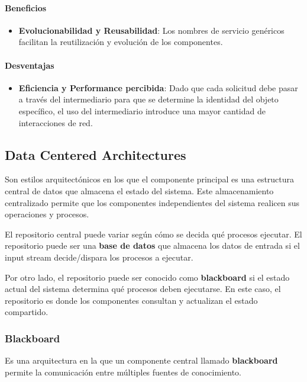 \documentclass{article}
\begin{document}
			\paragraph{Beneficios}
			\begin{itemize}	
				\item {\textbf{Evolucionabilidad y Reusabilidad}}: Los nombres de servicio genéricos facilitan la reutilización y evolución de los componentes.
				
				
			\end{itemize}
			
			\paragraph{Desventajas}
			\begin{itemize}	
				
				\item {\textbf{Eficiencia y Performance percibida}}: Dado que cada solicitud debe pasar a través del intermediario para que se determine la identidad del objeto específico, el uso del intermediario introduce una mayor cantidad de interacciones de red.
				
			\end{itemize}
		
		\subsection{Data Centered Architectures}
		Son estilos arquitectónicos en los que el componente principal es una estructura central de datos que almacena el estado del sistema. Este almacenamiento centralizado permite que los componentes independientes del sistema realicen sus operaciones y procesos.
		
		El repositorio central puede variar según cómo se decida qué procesos ejecutar. El repositorio puede ser una \textbf{base de datos} que almacena los datos de entrada si el input stream decide/dispara los procesos a ejecutar.
		
		 Por otro lado, el repositorio puede ser conocido como \textbf{blackboard} si el estado actual del sistema determina qué procesos deben ejecutarse. En este caso, el repositorio es donde los componentes consultan y actualizan el estado compartido.
			\subsubsection{Blackboard}
			Es una arquitectura en la que un componente central llamado \textbf{blackboard} permite la comunicación entre múltiples fuentes de conocimiento.
				
\end{document}
